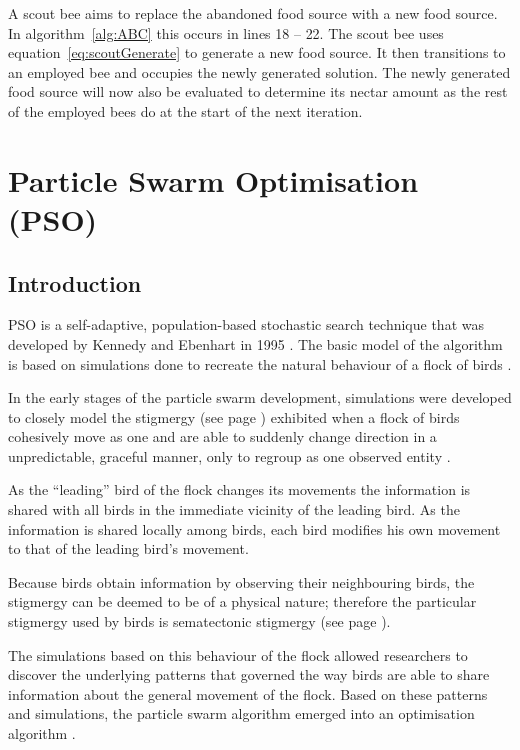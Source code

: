 A scout bee aims to replace the abandoned food source with a new food source. In algorithm~\ref{alg:ABC} this occurs in lines 18 -- 22. The scout bee uses equation~\ref{eq:scoutGenerate} to generate a new food source. It then transitions to an employed bee and occupies the newly generated solution. The newly generated food source will now also be evaluated to determine its nectar amount as the rest of the employed bees do at the start of the next iteration.


\section{Particle Swarm Optimisation (PSO)}

\label{sec:PSO}
\subsection{Introduction}
\label{sec:psointro}
PSO is a self-adaptive, population-based stochastic search technique that was developed by Kennedy and Ebenhart in 1995 \cite{PSOGABreeding}. The basic model of the algorithm is based on simulations done to recreate the natural behaviour of a flock of birds \cite{PSOSoftTesting}.

In the early stages of the particle swarm development, simulations were developed to closely model the stigmergy (see page \pageref{sec:stigmergy}) exhibited when a flock of birds cohesively move as one and are able to suddenly change direction in a unpredictable, graceful manner, only to regroup as one observed entity \cite{PSOHybridJobShop}. 

As the ``leading'' bird of the flock changes its movements the information is shared with all birds in the immediate vicinity of the leading bird. As the information is shared locally among birds, each bird modifies his own movement to that of the leading bird's movement\cite{PSOHybridJobShop}. 

Because birds obtain information by observing their neighbouring birds, the stigmergy can be deemed to be of a physical nature; therefore the particular stigmergy used by birds is sematectonic stigmergy (see page \pageref{def:sematectonic}).

The simulations based on this behaviour of the flock allowed researchers to discover the underlying patterns that governed the way birds are able to share information about the general movement of the flock. Based on these patterns and simulations, the particle swarm algorithm emerged into an optimisation algorithm \cite{CompuIntelligenceIntro}.

